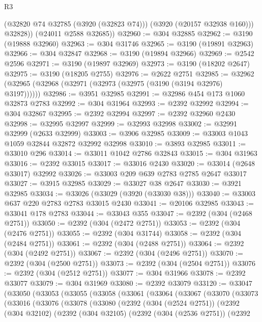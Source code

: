 \begin{lexlean}{R3}
\begin{coremodule}
            (@32820 @74 @32785 (@3920 (@32823 @74)))
            (@3920 (@20157 @32938 @160)))
          @32828))
      (@24011 @2588 @32685))
@32960 := @304 @32885
@32962 := @3190 (@19888 @32960)
@32963 := @304 @31746
@32965 := @3190 (@19891 @32963)
@32966 := @304 @32847
@32968 := @3190 (@19894 @32966)
@32969 := @2542 @2596
@32971 := @3190 (@19897 @32969)
@32973 := @3190 (@18202 @2647)
@32975 := @3190 (@18205 @2755)
@32976 := @2622 @2751
@32985 := @32962 (@32965 (@32968 (@32971 (@32973 (@32975 (@3190 (@3194 @32976) @3197))))))
@32986 := @3951 @32985
@32991 := @32986 @454 @173 @1060 @32873 @2783
@32992 := @304 @31964
@32993 := @2392 @32992
@32994 := @304 @32867
@32995 := @2392 @32994
@32997 := @2392 @32960 @2430
@32998 := @32995 @32997
@32999 := @32993 @32998
@33002 := @32991 @32999 (@2633 @32999)
@33003 := @3906 @32985
@33009 := @33003 @1043 @1059 @32844 @32872 @32992 @32998
@33010 := @3893 @32985
@33011 := @33010 @296
@33014 := @33011 @1042 @2786 @32843
@33015 := @304 @31963
@33016 := @2392 @33015
@33017 := @33016 @2430
@33020 := @33014 (@2648 @33017) @32992
@33026 := @33003 @209 @639 @2783 @2785 @2647 @33017
@33027 := @3915 @32985
@33029 := @33027 @38 @2647
@33030 := @3921 @32985
@33034 := @33026 (@33029 (@3920 (@33030 @38)))
@33040 := @33003 @637 @220 @2783 @2783 @33015 @2430
@33041 := @20106 @32985
@33043 := @33041 @178 @2783
@33044 := @33043 @355
@33047 := @2392 (@304 (@2468 @2751))
@33050 := @2392 (@304 (@2472 @2751))
@33053 := @2392 (@304 (@2476 @2751))
@33055 := @2392 (@304 @31744)
@33058 := @2392 (@304 (@2484 @2751))
@33061 := @2392 (@304 (@2488 @2751))
@33064 := @2392 (@304 (@2492 @2751))
@33067 := @2392 (@304 (@2496 @2751))
@33070 := @2392 (@304 (@2500 @2751))
@33073 := @2392 (@304 (@2504 @2751))
@33076 := @2392 (@304 (@2512 @2751))
@33077 := @304 @31966
@33078 := @2392 @33077
@33079 := @304 @31969
@33080 := @2392 @33079
@33120 := @33047
    (@33050
      (@33053
        (@33055
          (@33058
            (@33061
              (@33064
                (@33067
                  (@33070
                    (@33073
                      (@33016
                        (@33076
                          (@33078
                            (@33080
                              (@2392
                                (@304 (@2524 @2751))
                                (@2392
                                  (@304 @32102)
                                  (@2392
                                    (@304 @32105)
                                    (@2392
                                      (@304 (@2536 @2751))
                                      (@2392

\end{coremodule}
\end{lexlean}
